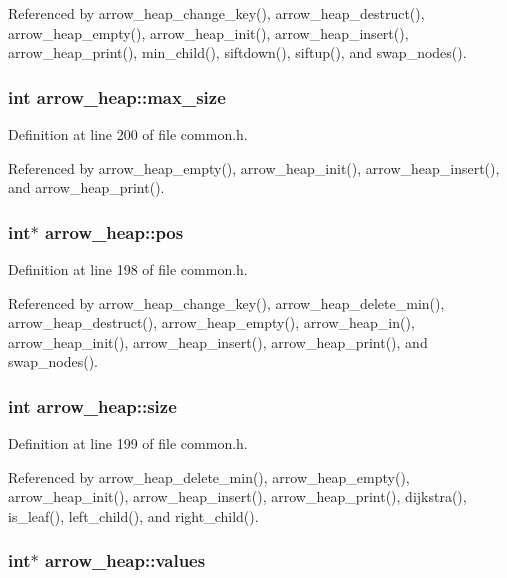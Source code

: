 Referenced by arrow\_\-heap\_\-change\_\-key(), arrow\_\-heap\_\-destruct(), arrow\_\-heap\_\-empty(), arrow\_\-heap\_\-init(), arrow\_\-heap\_\-insert(), arrow\_\-heap\_\-print(), min\_\-child(), siftdown(), siftup(), and swap\_\-nodes().\hypertarget{structarrow__heap_e668dd3f450ba07df5998b8d084e6949}{
\subsubsection[{max\_\-size}]{\setlength{\rightskip}{0pt plus 5cm}int {\bf arrow\_\-heap::max\_\-size}}}
\label{structarrow__heap_e668dd3f450ba07df5998b8d084e6949}




Definition at line 200 of file common.h.

Referenced by arrow\_\-heap\_\-empty(), arrow\_\-heap\_\-init(), arrow\_\-heap\_\-insert(), and arrow\_\-heap\_\-print().\hypertarget{structarrow__heap_a39c7b18964b26c78a96f51406d8d7ab}{
\subsubsection[{pos}]{\setlength{\rightskip}{0pt plus 5cm}int$\ast$ {\bf arrow\_\-heap::pos}}}
\label{structarrow__heap_a39c7b18964b26c78a96f51406d8d7ab}




Definition at line 198 of file common.h.

Referenced by arrow\_\-heap\_\-change\_\-key(), arrow\_\-heap\_\-delete\_\-min(), arrow\_\-heap\_\-destruct(), arrow\_\-heap\_\-empty(), arrow\_\-heap\_\-in(), arrow\_\-heap\_\-init(), arrow\_\-heap\_\-insert(), arrow\_\-heap\_\-print(), and swap\_\-nodes().\hypertarget{structarrow__heap_afeff09d63b1f6ec6fc910d3407972de}{
\subsubsection[{size}]{\setlength{\rightskip}{0pt plus 5cm}int {\bf arrow\_\-heap::size}}}
\label{structarrow__heap_afeff09d63b1f6ec6fc910d3407972de}




Definition at line 199 of file common.h.

Referenced by arrow\_\-heap\_\-delete\_\-min(), arrow\_\-heap\_\-empty(), arrow\_\-heap\_\-init(), arrow\_\-heap\_\-insert(), arrow\_\-heap\_\-print(), dijkstra(), is\_\-leaf(), left\_\-child(), and right\_\-child().\hypertarget{structarrow__heap_e2641f7a933ecb92d32acd3a50caa442}{
\subsubsection[{values}]{\setlength{\rightskip}{0pt plus 5cm}int$\ast$ {\bf arrow\_\-heap::values}}}
\label{structarrow__heap_e2641f7a933ecb92d32acd3a50caa442}




